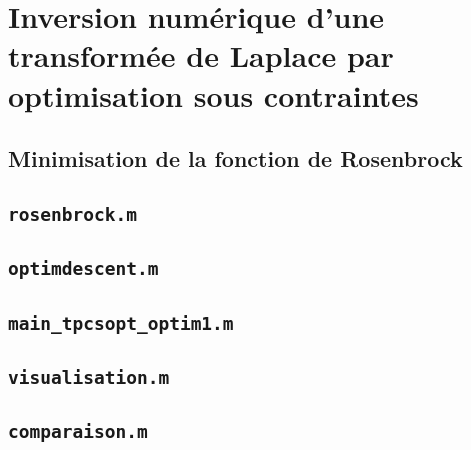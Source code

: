 \documentclass[12pt,a4paper,titlepage]{article}
\begin{document}
\newpage
\section{Inversion numérique d’une transformée de Laplace par optimisation sous contraintes}

\newpage

\begin{appendices}

    \section{Minimisation de la fonction de Rosenbrock}

    \subsection{\texttt{rosenbrock.m}}

    

    \subsection{\texttt{optimdescent.m}}

    

    \subsection{\texttt{main_tpcsopt_optim1.m}}

    

    \subsection{\texttt{visualisation.m}}

    

    \subsection{\texttt{comparaison.m}}

    

\end{appendices}
\end{document}

